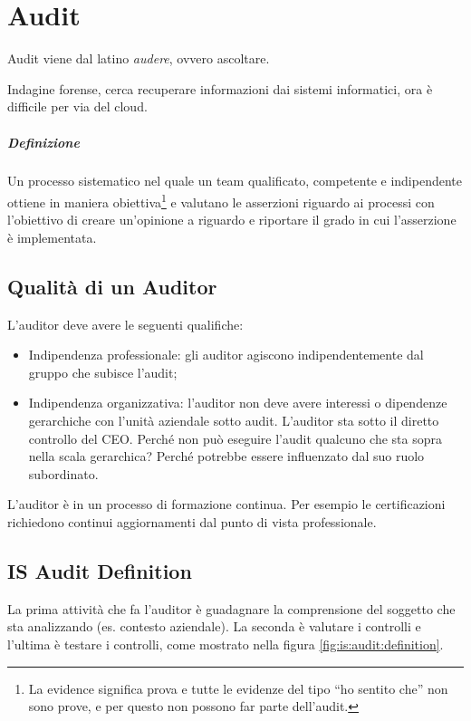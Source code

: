 \chapter{Audit}
\label{audit}

Audit viene dal latino \textit{audere}, ovvero ascoltare.

Indagine forense, cerca recuperare informazioni dai sistemi informatici, ora è
difficile per via del cloud.

\paragraph*{Definizione}

Un processo sistematico nel quale un team qualificato, competente e
indipendente ottiene in maniera obiettiva\footnote{La evidence significa prova e
tutte le evidenze del tipo ``ho sentito che'' non sono prove, e per questo non
possono far parte dell'audit.} e valutano le asserzioni riguardo ai processi
con l'obiettivo di creare un'opinione a riguardo e riportare il grado in cui
l'asserzione è implementata.


\section{Qualità di un Auditor}

L'auditor deve avere le seguenti qualifiche:
\begin{itemize}
\item Indipendenza professionale: gli auditor agiscono indipendentemente dal
gruppo che subisce l'audit;
\item Indipendenza organizzativa: l'auditor non deve avere interessi o
dipendenze gerarchiche con l'unità aziendale sotto audit. L'auditor sta sotto
il diretto controllo del CEO. Perché non può eseguire l'audit qualcuno che sta
sopra nella scala gerarchica? Perché potrebbe essere influenzato dal suo ruolo
subordinato.
\end{itemize}

L'auditor è in un processo di formazione continua. Per esempio le 
certificazioni richiedono continui aggiornamenti dal punto di vista 
professionale.

\section{IS Audit Definition}

La prima attività che fa l'auditor è guadagnare la comprensione del soggetto
che sta analizzando (es. contesto aziendale).
La seconda è valutare i controlli e l'ultima è testare i controlli, come
mostrato nella figura \ref{fig:is:audit:definition}.

